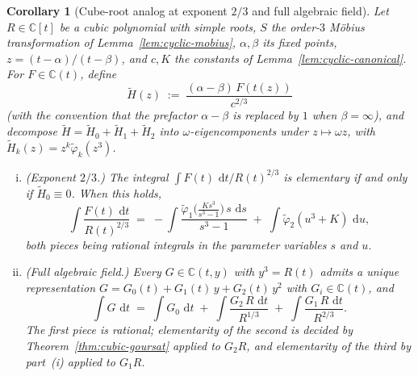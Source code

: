 \documentclass[11pt,a4paper]{article}
\theoremstyle{plain}
\newtheorem{corollary}[theorem]{Corollary}
\theoremstyle{definition}
\theoremstyle{remark}
\newcommand{\C}{\mathbb{C}}
\renewcommand{\d}{\,\mathrm{d}}
\begin{document}
\begin{corollary}[Cube-root analog at exponent $2/3$ and full algebraic field]\label{cor:two-thirds}
Let $R\in\C[t]$ be a cubic polynomial with simple roots, $S$ the order-$3$ M\"obius transformation of Lemma~\ref{lem:cyclic-mobius}, $\alpha,\beta$ its fixed points, $z=(t-\alpha)/(t-\beta)$, and $c, K$ the constants of Lemma~\ref{lem:cyclic-canonical}. For $F\in\C(t)$, define
\begin{equation}\label{eq:Htilde-formula}
  \widetilde H(z) \;:=\; \frac{(\alpha-\beta)\,F(t(z))}{c^{2/3}}
\end{equation}
(with the convention that the prefactor $\alpha-\beta$ is replaced by $1$ when $\beta=\infty$), and decompose $\widetilde H = \widetilde H_0 + \widetilde H_1 + \widetilde H_2$ into $\omega$-eigencomponents under $z\mapsto\omega z$, with $\widetilde H_k(z) = z^k\widetilde\varphi_k(z^3)$.
\begin{enumerate}[(i)]
  \item \emph{(Exponent $2/3$.)} The integral $\int F(t)\,\d t/R(t)^{2/3}$ is elementary if and only if $\widetilde H_0\equiv 0$. When this holds,
  \begin{equation}\label{eq:two-thirds-reduction}
    \int \frac{F(t)\,\d t}{R(t)^{2/3}}
    \;=\; -\!\int \frac{\widetilde\varphi_1\!\bigl(\tfrac{Ks^3}{s^3-1}\bigr)\,s\,\d s}{s^3-1}
    \;+\; \int \widetilde\varphi_2(u^3+K)\,\d u,
  \end{equation}
  both pieces being rational integrals in the parameter variables $s$ and $u$.
  \item \emph{(Full algebraic field.)} Every $G\in\C(t,y)$ with $y^3=R(t)$ admits a unique representation $G = G_0(t) + G_1(t)\,y + G_2(t)\,y^2$ with $G_i\in\C(t)$, and
  \begin{equation}\label{eq:cubic-field-split}
    \int G\,\d t \;=\; \int G_0\,\d t \;+\; \int \frac{G_2\,R\,\d t}{R^{1/3}} \;+\; \int \frac{G_1\,R\,\d t}{R^{2/3}}.
  \end{equation}
  The first piece is rational; elementarity of the second is decided by Theorem~\ref{thm:cubic-goursat} applied to $G_2 R$, and elementarity of the third by part~(i) applied to $G_1 R$.
\end{enumerate}
\end{corollary}
\end{document}
